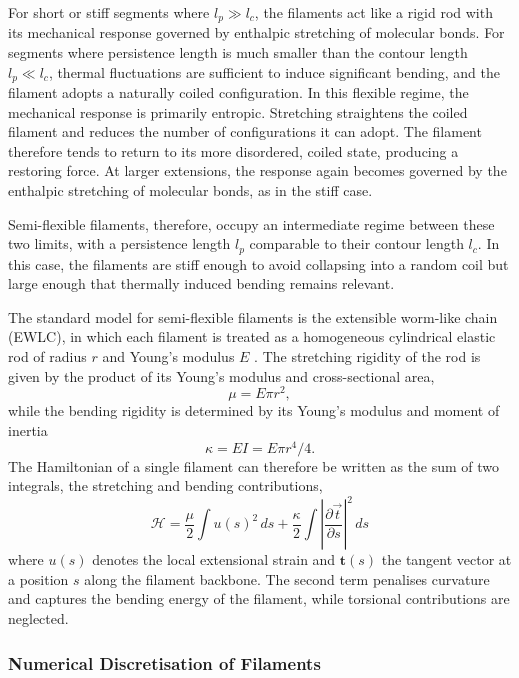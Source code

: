 For short or stiff segments where $l_p \gg l_c$, the filaments act like a rigid rod with its mechanical response governed by enthalpic stretching of molecular bonds. For segments where persistence length is much smaller than the contour length $l_p \ll l_c$, thermal fluctuations are sufficient to induce significant bending, and the filament adopts a naturally coiled configuration. In this flexible regime, the mechanical response is primarily entropic. Stretching straightens the coiled filament and reduces the number of configurations it can adopt. The filament therefore tends to return to its more disordered, coiled state, producing a restoring force. At larger extensions, the response again becomes governed by the enthalpic stretching of molecular bonds, as in the stiff case. 

Semi-flexible filaments, therefore, occupy an intermediate regime between these two limits, with a persistence length $l_p$ comparable to their contour length $l_c$. In this case, the filaments are stiff enough to avoid collapsing into a random coil but large enough that thermally induced bending remains relevant. 

The standard model for semi-flexible filaments is the extensible worm-like chain (EWLC), in which each filament is treated as a homogeneous cylindrical elastic rod of radius $r$ and Young's modulus $E$ \cite{doi_theory_1988}. The stretching rigidity of the rod is given by the product of its Young's modulus and cross-sectional area,
\[
    \mu = E \pi r^2,
\]
while the bending rigidity is determined by its Young's modulus and moment of inertia
\[
    \kappa = E I = E \pi r^4 / 4.
\]
The Hamiltonian of a single filament can therefore be written as the sum of two integrals, the stretching and bending contributions,
\begin{equation*}
    \mathcal{H} = \frac{\mu}{2} \int u(s)^2 \, ds + \frac{\kappa}{2} \int \left| \frac{\partial \vec{t}}{\partial s} \right|^2 \, ds
\end{equation*}
where \(u(s)\) denotes the local extensional strain and \(\bm{t}(s)\) the tangent vector at a position $s$ along the filament backbone. The second term penalises curvature and captures the bending energy of the filament, while torsional contributions are neglected.

\subsubsection*{Numerical Discretisation of Filaments}

